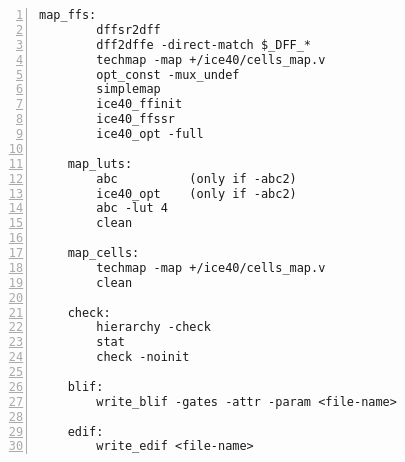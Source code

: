 \begin{lstlisting}[numbers=left,frame=single]
    map_ffs:
        dffsr2dff
        dff2dffe -direct-match $_DFF_*
        techmap -map +/ice40/cells_map.v
        opt_const -mux_undef
        simplemap
        ice40_ffinit
        ice40_ffssr
        ice40_opt -full

    map_luts:
        abc          (only if -abc2)
        ice40_opt    (only if -abc2)
        abc -lut 4
        clean

    map_cells:
        techmap -map +/ice40/cells_map.v
        clean

    check:
        hierarchy -check
        stat
        check -noinit

    blif:
        write_blif -gates -attr -param <file-name>

    edif:
        write_edif <file-name>
\end{lstlisting}

